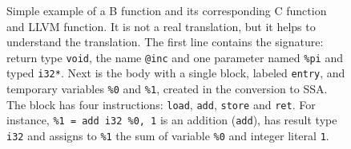 \documentclass{llncs}
\newcommand{\llvm}[1]{\texttt{#1}}
\begin{document}
\begin{figure}
\begin{minipage}[t]{.6\textwidth}
  \end{minipage}
  \caption{Simple example of a B function and its corresponding  C function and LLVM function.
    It is not a real translation, but it helps to understand the translation. %
    The first line contains the signature: return type \llvm{void}, the name
    \llvm{@inc} and one parameter named \llvm{\%pi} and typed \llvm{i32*}.  Next
    is the body with a single block, labeled \llvm{entry}, and temporary
    variables \llvm{\%0} and \llvm{\%1}, created in the conversion to SSA. The
    block has four instructions: \llvm{load}, \llvm{add}, \llvm{store} and
    \llvm{ret}. For instance, \llvm{\%1 = add i32 \%0, 1} is an addition
    (\llvm{add}), has result type \llvm{i32} and assigns to
    \llvm{\%1} the sum of variable \llvm{\%0} and integer
    literal \llvm{1}.}
  \label{fig:ex-llvm}
\end{figure}
\end{document}
